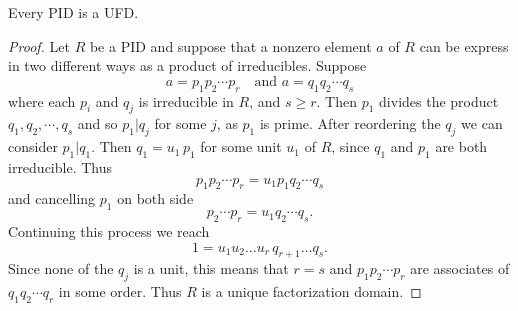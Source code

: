 \begin{theorem}
    Every PID is a UFD.
\end{theorem}
\begin{proof}
    Let $R$ be a PID and suppose that a nonzero element $a$ of $R$ can be express in two different ways 
    as a product of irreducibles. Suppose
    \[
        a = p_1 p_2 \cdots p_r \quad \text{and } a = q_1 q_2 \cdots q_s 
    \]
    where each $p_i$ and $q_j$ is irreducible in $R$, and $s \geq r$. Then $p_1$ divides the 
    product $q_1, q_2, \cdots, q_s $ and so $p_1 | q_j$ for some $j$, as $p_1$ is prime. 
    After reordering the $q_j$ we can consider $p_1|q_1$. Then $q_1 = u_1\, p_1$ for some unit $u_1$ of $R$,
    since $q_1$ and $p_1$ are both irreducible. Thus
    \[
        p_1 p_2 \cdots p_r = u_1 p_1 q_2 \cdots q_s
    \]
    and cancelling $p_1$ on both side
    \[
        p_2 \cdots p_r = u_1 q_2 \cdots q_s.
    \]
    Continuing this process we reach
    \[
        1 = u_1 u_2 \ldots u_r\, q_{r+1} \ldots q_s.
    \]
    Since none of the $q_j$ is a unit, this means that $r=s$ and $p_1 p_2 \cdots p_r$ are associates of 
    $q_1 q_2 \cdots q_r$ in some order. Thus $R$ is a unique factorization domain.
\end{proof}
